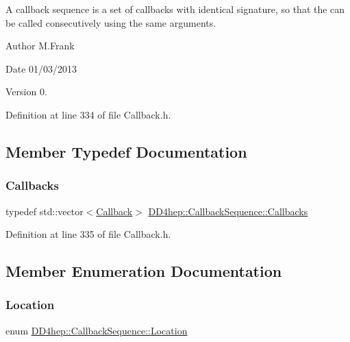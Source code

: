 A callback sequence is a set of callbacks with identical signature, so that the can be called consecutively using the same arguments.

\begin{DoxyAuthor}{Author}
M.\+Frank 
\end{DoxyAuthor}
\begin{DoxyDate}{Date}
01/03/2013 
\end{DoxyDate}
\begin{DoxyVersion}{Version}
0. 
\end{DoxyVersion}


Definition at line 334 of file Callback.\+h.



\subsection{Member Typedef Documentation}
\hypertarget{struct_d_d4hep_1_1_callback_sequence_a2d9d9488b193731498c4b9cc0fdc4a6b}{}\label{struct_d_d4hep_1_1_callback_sequence_a2d9d9488b193731498c4b9cc0fdc4a6b} 
\subsubsection{\texorpdfstring{Callbacks}{Callbacks}}
{\footnotesize\ttfamily typedef std\+::vector$<$\hyperlink{class_d_d4hep_1_1_callback}{Callback}$>$ \hyperlink{struct_d_d4hep_1_1_callback_sequence_a2d9d9488b193731498c4b9cc0fdc4a6b}{D\+D4hep\+::\+Callback\+Sequence\+::\+Callbacks}}



Definition at line 335 of file Callback.\+h.



\subsection{Member Enumeration Documentation}
\hypertarget{struct_d_d4hep_1_1_callback_sequence_a7753490247479633aed16a2376821ef7}{}\label{struct_d_d4hep_1_1_callback_sequence_a7753490247479633aed16a2376821ef7} 
\subsubsection{\texorpdfstring{Location}{Location}}
{\footnotesize\ttfamily enum \hyperlink{struct_d_d4hep_1_1_callback_sequence_a7753490247479633aed16a2376821ef7}{D\+D4hep\+::\+Callback\+Sequence\+::\+Location}}

